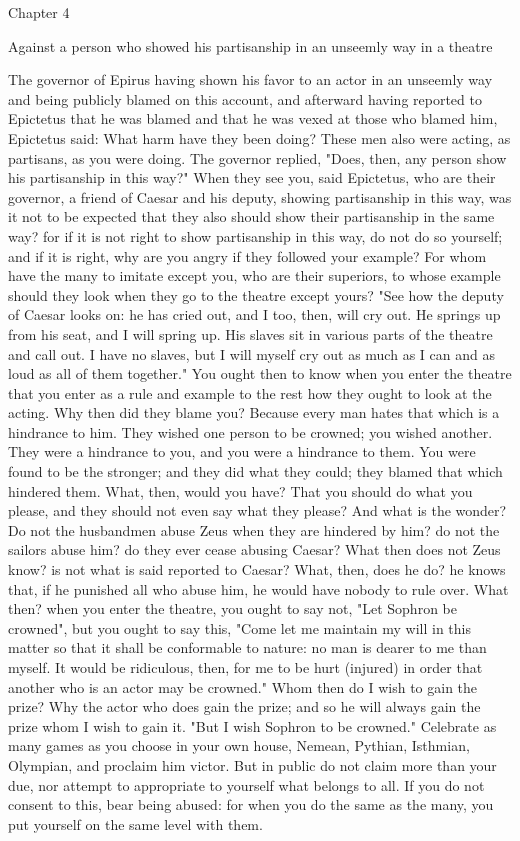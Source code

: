 \documentclass[a4paper]{article}
\begin{document}
Chapter 4

Against a person who showed his partisanship in an unseemly way in a theatre

    The governor of Epirus having shown his favor to an actor in an unseemly
way and being publicly blamed on this account, and afterward having reported to
Epictetus that he was blamed and that he was vexed at those who blamed him,
Epictetus said: What harm have they been doing? These men also were acting, as
partisans, as you were doing. The governor replied, "Does, then, any person
show his partisanship in this way?" When they see you, said Epictetus, who are
their governor, a friend of Caesar and his deputy, showing partisanship in this
way, was it not to be expected that they also should show their partisanship in
the same way? for if it is not right to show partisanship in this way, do not
do so yourself; and if it is right, why are you angry if they followed your
example? For whom have the many to imitate except you, who are their superiors,
to whose example should they look when they go to the theatre except yours?
"See how the deputy of Caesar looks on: he has cried out, and I too, then, will
cry out. He springs up from his seat, and I will spring up. His slaves sit in
various parts of the theatre and call out. I have no slaves, but I will myself
cry out as much as I can and as loud as all of them together." You ought then
to know when you enter the theatre that you enter as a rule and example to the
rest how they ought to look at the acting. Why then did they blame you? Because
every man hates that which is a hindrance to him. They wished one person to be
crowned; you wished another. They were a hindrance to you, and you were a
hindrance to them. You were found to be the stronger; and they did what they
could; they blamed that which hindered them. What, then, would you have? That
you should do what you please, and they should not even say what they please?
And what is the wonder? Do not the husbandmen abuse Zeus when they are hindered
by him? do not the sailors abuse him? do they ever cease abusing Caesar? What
then does not Zeus know? is not what is said reported to Caesar? What, then,
does he do? he knows that, if he punished all who abuse him, he would have
nobody to rule over. What then? when you enter the theatre, you ought to say
not, "Let Sophron be crowned", but you ought to say this, "Come let me maintain
my will in this matter so that it shall be conformable to nature: no man is
dearer to me than myself. It would be ridiculous, then, for me to be hurt
(injured) in order that another who is an actor may be crowned." Whom then do I
wish to gain the prize? Why the actor who does gain the prize; and so he will
always gain the prize whom I wish to gain it. "But I wish Sophron to be
crowned." Celebrate as many games as you choose in your own house, Nemean,
Pythian, Isthmian, Olympian, and proclaim him victor. But in public do not
claim more than your due, nor attempt to appropriate to yourself what belongs
to all. If you do not consent to this, bear being abused: for when you do the
same as the many, you put yourself on the same level with them.
\end{document}
